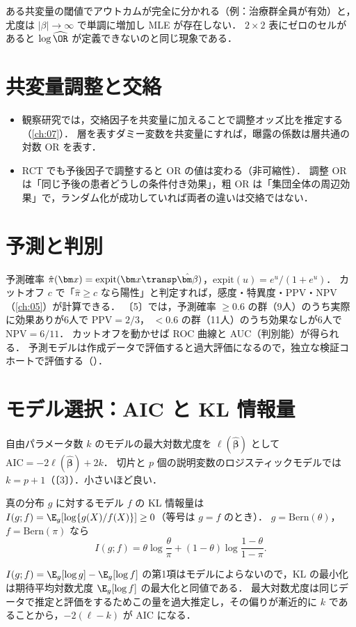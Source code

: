 \begin{supbox}[補足：完全分離]
ある共変量の閾値でアウトカムが完全に分かれる（例：治療群全員が有効）と，尤度は $|\beta|\to\infty$ で単調に増加し MLE が存在しない．
$2\times2$ 表にゼロのセルがあると $\log\widehat{\OR}$ が定義できないのと同じ現象である．
\end{supbox}

\section{共変量調整と交絡}\label{sec:06-adjust}
\begin{itemize}
\item 観察研究では，交絡因子を共変量に加えることで調整オッズ比を推定する（\cref{ch:07}）．
      層を表すダミー変数を共変量にすれば，曝露の係数は層共通の対数 OR を表す．
\item RCT でも予後因子で調整すると OR の値は変わる（非可縮性）．
      調整 OR は「同じ予後の患者どうしの条件付き効果」，粗 OR は「集団全体の周辺効果」で，ランダム化が成功していれば両者の違いは交絡ではない．
\end{itemize}

\section{予測と判別}\label{sec:06-predict}
予測確率 $\hat\pi(\bm x)=\mathrm{expit}(\bm x\transp\hat{\bm\beta})$，$\mathrm{expit}(u)=e^u/(1+e^u)$．
カットオフ $c$ で「$\hat\pi\ge c$ なら陽性」と判定すれば，感度・特異度・PPV・NPV（\cref{ch:05}）が計算できる．
〔5〕では，予測確率 $\ge0.6$ の群（9人）のうち実際に効果ありが6人で $\mathrm{PPV}=2/3$，
$<0.6$ の群（11人）のうち効果なしが6人で $\mathrm{NPV}=6/11$．
カットオフを動かせば ROC 曲線と AUC（判別能）が得られる．
予測モデルは作成データで評価すると過大評価になるので，独立な検証コホートで評価する（）．

\section{モデル選択：AIC と KL 情報量}\label{sec:06-aic}
\begin{teigi}[AIC]\label{def:06-aic}
自由パラメータ数 $k$ のモデルの最大対数尤度を $\ell(\hat{\bm\beta})$ として $\mathrm{AIC}=-2\ell(\hat{\bm\beta})+2k$．
切片と $p$ 個の説明変数のロジスティックモデルでは $k=p+1$（〔3〕）．小さいほど良い．
\end{teigi}
\begin{teigi}\label{def:06-kl}
真の分布 $g$ に対するモデル $f$ の KL 情報量は $I(g;f)=\E_g[\log\{g(X)/f(X)\}]\ge0$（等号は $g=f$ のとき）．
$g=\mathrm{Bern}(\theta)$，$f=\mathrm{Bern}(\pi)$ なら
\begin{equation}
I(g;f)=\theta\log\frac\theta\pi+(1-\theta)\log\frac{1-\theta}{1-\pi}.\label{eq:06-kl}
\end{equation}
\end{teigi}
$I(g;f)=\E_g[\log g]-\E_g[\log f]$ の第1項はモデルによらないので，KL の最小化は期待平均対数尤度 $\E_g[\log f]$ の最大化と同値である．
最大対数尤度は同じデータで推定と評価をするためこの量を過大推定し，その偏りが漸近的に $k$ であることから，$-2(\ell-k)$ が AIC になる．

